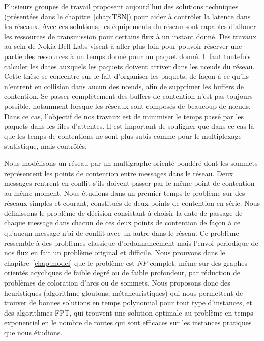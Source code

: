 Plusieurs groupes de travail proposent aujourd'hui des solutions techniques (présentées dans le chapitre~\ref{chap:TSN}) pour aider à contrôler la latence dans les réseaux. Avec ces solutions, les équipements du réseau sont capables d'allouer les ressources de transmission pour certains flux à un instant donné. Des travaux au sein de Nokia Bell Labs visent à aller plus loin pour pouvoir réserver une partie des ressources à un temps donné pour un paquet donné. Il faut toutefois calculer les dates auxquels les paquets doivent arriver dans les nœuds du réseau. Cette thèse se concentre sur le fait d'organiser les paquets, de façon à ce qu'ils n'entrent en collision dans aucun des nœuds, afin de supprimer les buffers de contention. Se passer complètement des buffers de contention n'est pas toujours possible, notamment lorsque les réseaux sont composés de beaucoup de nœuds. Dans ce cas, l'objectif de nos travaux est de minimiser le temps passé par les paquets dans les files d'attentes. Il est important de souligner que dans ce cas-là que les temps de contentions ne sont plus subis comme pour le multiplexage statistique, mais contrôlés.

Nous modélisons un réseau par un multigraphe orienté pondéré dont les sommets représentent les points de contention entre messages dans le réseau. Deux messages rentrent en conflit s’ils doivent passer par le même point de contention au même moment. Nous étudions dans un premier temps le problème sur des réseaux simples et courant, constitués de deux points de contention en série. 
Nous définissons le problème de décision consistant à choisir la date de passage de chaque message dans chacun de ces deux points de contention de façon à ce qu'aucun message n'ai de conflit avec un autre dans le réseau. Ce problème ressemble à des problèmes classique d'ordonnancement mais l'envoi periodique de nos flux en fait un problème original et difficile. Nous prouvons dans le chapitre~\ref{chap:model} que le problème est $NP$-complet, même sur des graphes orientés acycliques de faible degré ou de faible profondeur, par réduction de problèmes de coloration d'arcs ou de sommets. Nous proposons donc des heuristiques (algorithme gloutons, métaheuristiques) qui nous permettent de trouver de bonnes solutions en temps polynomial pour tout type d'instances, et des algorithmes FPT, qui trouvent une solution optimale au problème en temps exponentiel en le nombre de routes qui sont efficaces sur les instances pratiques que nous étudions.


